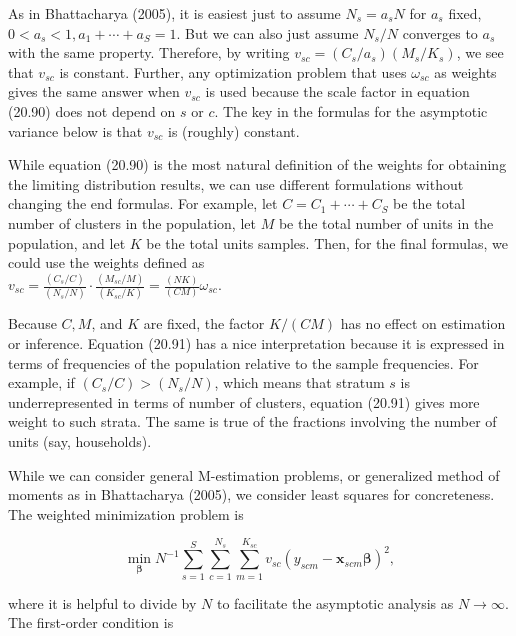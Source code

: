 \documentclass[10pt]{article}
\begin{document}
As in Bhattacharya (2005), it is easiest just to assume $N_{s}=a_{s} N$ for $a_{s}$ fixed, $0<a_{s}<1, a_{1}+\cdots+a_{S}=1$. But we can also just assume $N_{s} / N$ converges to $a_{s}$ with the same property. Therefore, by writing $v_{s c}=\left(C_{s} / a_{s}\right)\left(M_{s} / K_{s}\right)$, we see that $v_{s c}$ is constant. Further, any optimization problem that uses $\omega_{s c}$ as weights gives the same answer when $v_{s c}$ is used because the scale factor in equation (20.90) does not depend on $s$ or $c$. The key in the formulas for the asymptotic variance below is that $v_{s c}$ is (roughly) constant.

While equation (20.90) is the most natural definition of the weights for obtaining the limiting distribution results, we can use different formulations without changing the end formulas. For example, let $C=C_{1}+\cdots+C_{S}$ be the total number of clusters in the population, let $M$ be the total number of units in the population, and let $K$ be the total units samples. Then, for the final formulas, we could use the weights defined as\\
$v_{s c}=\frac{\left(C_{s} / C\right)}{\left(N_{s} / N\right)} \cdot \frac{\left(M_{s c} / M\right)}{\left(K_{s c} / K\right)}=\frac{(N K)}{(C M)} \omega_{s c}$.

Because $C, M$, and $K$ are fixed, the factor $K /(C M)$ has no effect on estimation or inference. Equation (20.91) has a nice interpretation because it is expressed in terms of frequencies of the population relative to the sample frequencies. For example, if $\left(C_{s} / C\right)>\left(N_{s} / N\right)$, which means that stratum $s$ is underrepresented in terms of number of clusters, equation (20.91) gives more weight to such strata. The same is true of the fractions involving the number of units (say, households).

While we can consider general M-estimation problems, or generalized method of moments as in Bhattacharya (2005), we consider least squares for concreteness. The weighted minimization problem is


\begin{equation*}
\min _{\boldsymbol{\beta}} N^{-1} \sum_{s=1}^{S} \sum_{c=1}^{N_{s}} \sum_{m=1}^{K_{s c}} v_{s c}\left(y_{s c m}-\mathbf{x}_{s c m} \boldsymbol{\beta}\right)^{2}, \tag{20.92}
\end{equation*}


where it is helpful to divide by $N$ to facilitate the asymptotic analysis as $N \rightarrow \infty$. The first-order condition is
\end{document}
